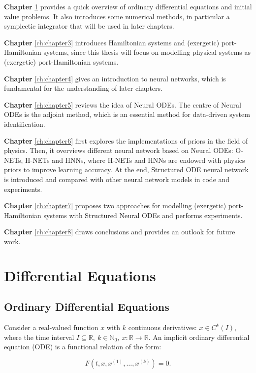 \documentclass[
	parskip, 			   %
	twoside, 			   %
	DIV=14, 			   %
	BCOR=15.0mm, 		   %
	headsepline, 		   %
	open=right, 		   %
	captions=tableheading, %
	bibliography=totoc,    %
	numbers=noenddot       %
]{scrreprt}
\begin{document}
\textbf{Chapter} \ref{ch:chapter2} provides a quick overview of ordinary differential equations and initial value problems. It also introduces some numerical methods, in particular a symplectic integrator that will be used in later chapters.

\textbf{Chapter} \ref{ch:chapter3} introduces Hamiltonian systems and (exergetic) port-Hamiltonian systems, since this thesis will focus on modelling physical systems as (exergetic) port-Hamiltonian systems.

\textbf{Chapter} \ref{ch:chapter4} gives an introduction to neural networks, which is fundamental for the understanding of later chapters.

\textbf{Chapter} \ref{ch:chapter5} reviews the idea of Neural ODEs. The centre of Neural ODEs is the adjoint method, which is an essential method for data-driven system identification.

\textbf{Chapter} \ref{ch:chapter6} first explores the implementations of priors in the field of physics. Then, it overviews different neural network based on Neural ODEs: O-NETs, H-NETs and HNNs, where H-NETs and HNNs are endowed with physics priors to improve learning accuracy. At the end, Structured ODE neural network is introduced and compared with other neural network models in code and experiments.

\textbf{Chapter} \ref{ch:chapter7} proposes two approaches for modelling (exergetic) port-Hamiltonian systems with Structured Neural ODEs and performs experiments.

\textbf{Chapter} \ref{ch:chapter8} draws conclusions and provides an outlook for future work.


\clearpage
\chapter{Differential Equations}
\label{ch:chapter2}

\section{Ordinary Differential Equations}
Consider a real-valued function $x$ with $k$ continuous derivatives: $x \in C^{k}(I)$, where the time interval $ I \subseteq \mathbb{R}, \: k \in \mathbb{N}_{0}, \: x: \mathbb{R} \rightarrow \mathbb{R}$. An implicit ordinary differential equation (ODE) is a functional relation of the form:

\begin{equation}
    \label{eq:implicit_ODE}
    F\left(t, x, x^{(1)}, \ldots, x^{(k)}\right)=0.
\end{equation}
\end{document}
